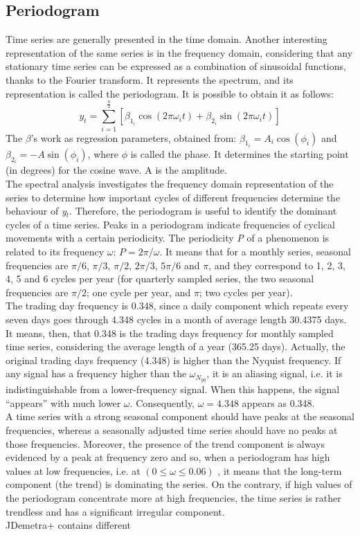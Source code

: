 \documentclass[english,blauw]{cbsdiscussionpaper}
\begin{document}
\subsection{Periodogram}
Time series are generally presented in the time domain. Another interesting representation of the same series is in the frequency domain, considering that any stationary time series can be expressed as a combination of sinusoidal functions, thanks to the Fourier transform. It represents the spectrum, and its representation is called the periodogram. It is possible to obtain it as follows:
\begin{equation}
y_t = \sum\limits_{i=1}^{\frac{n}{2}}[\beta_{1_{i}}\cos(2\pi\omega_{i}t) + \beta_{2_{i}}\sin(2\pi\omega_{i}t)]
\end{equation}
The $\beta$'s work as regression parameters, obtained from: $\beta_{1_{i}}=A_{i} \cos(\phi_{i})$ and $\beta_{2_{i}}=-A \sin(\phi_{i})$, where $\phi$ is called the phase. It determines the starting point (in degrees) for the cosine wave. A is the amplitude.\\The spectral analysis investigates the frequency domain representation of the series to determine how important cycles of different frequencies determine the behaviour of \textit{y$_t$}. Therefore, the periodogram is useful to identify the dominant cycles of a time series. Peaks in a periodogram indicate frequencies of cyclical movements with a certain periodicity. The periodicity \textit{P} of a phenomenon is related to its frequency $\omega$: $P=2 \pi / \omega$. It means that for a monthly series, seasonal frequencies are $\pi/6$, $\pi/3$, $\pi/2$, $2\pi/3$, $5\pi/6$ and $\pi$, and they correspond to 1, 2, 3, 4, 5 and 6 cycles per year (for quarterly sampled series, the two seasonal frequencies are $\pi/2$; one cycle per year, and $\pi$; two cycles per year).\\The trading day frequency is 0.348, since a daily component which repeats every seven days goes through 4.348 cycles in a month of average length 30.4375 days. It means, then, that 0.348 is the trading days frequency for monthly sampled time series, considering the average length of a year (365.25 days). Actually, the original trading days frequency (4.348) is higher than the Nyquist frequency. If any signal has a frequency higher than the $\omega_{N_{yq}}$, it is an aliasing signal, i.e. it is indistinguishable from a lower-frequency signal. When this happens, the signal “appears” with much lower $\omega$. Consequently, $\omega=4.348$ appears as 0.348.\\A time series with a strong seasonal component should have peaks at the seasonal frequencies, whereas a seasonally adjusted time series should have no peaks at those frequencies. Moreover, the presence of the trend component is always evidenced by a peak at frequency zero and so, when a periodogram has high values at low frequencies, i.e. at $(0 \leq \omega \leq 0.06)$ , it means that the long-term component (the trend) is dominating the series. On the contrary, if high values of the periodogram concentrate more at high frequencies, the time series is rather trendless and has a significant irregular component.\\JDemetra+ contains different 
\end{document}
